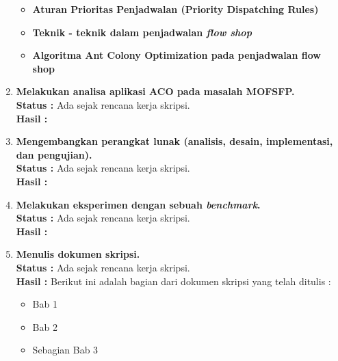 \documentclass[a4paper,twoside]{article}
\begin{document}
\begin{enumerate}
\begin{itemize}
		\end{itemize}	
		
		\begin{itemize}
		\item{\bf Aturan Prioritas Penjadwalan (Priority Dispatching Rules)}
		
		\end{itemize}			
		
		\begin{itemize}
		\item{\bf Teknik - teknik dalam penjadwalan {\it flow shop}}
		\end{itemize}	
		
		\begin{itemize}
		\item {\bf Algoritma Ant Colony Optimization pada penjadwalan flow shop}
		
		\end{itemize}
		
		
		
				
				
		
		
		
		
		\item \textbf{Melakukan analisa aplikasi ACO pada masalah MOFSFP.}\\
		{\bf Status :} Ada sejak rencana kerja skripsi.\\
		{\bf Hasil :}

		\item \textbf{Mengembangkan perangkat lunak (analisis, desain, implementasi, dan pengujian).}\\
		{\bf Status :} Ada sejak rencana kerja skripsi.\\
		{\bf Hasil :}

		\item \textbf{Melakukan eksperimen dengan sebuah {\it benchmark}.}\\
		{\bf Status :} Ada sejak rencana kerja skripsi.\\
		{\bf Hasil :}

		\item \textbf{Menulis dokumen skripsi.}\\
		{\bf Status :} Ada sejak rencana kerja skripsi.\\
		{\bf Hasil :} Berikut ini adalah bagian dari dokumen skripsi yang telah ditulis : 
		\begin{itemize}
		\item Bab 1
		\item Bab 2
		\item Sebagian Bab 3
		
		\end{itemize}

	
		

	\end{enumerate}
\end{document}
